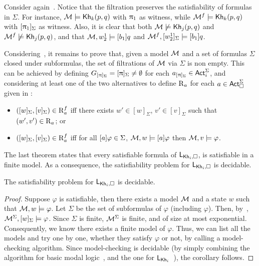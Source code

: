 \medskip 

\begin{example}\label{ex:filtration-preserves}
 Consider again~. Notice that the filtration preserves the satisfiability of formulas in $\Sigma$. For instance, $\mathcal{M}\models{\sf Kh}_k(p,q)$ with $\uppi_1$ as witness, while $\mathcal{M}^f\models{\sf Kh}_k(p,q)$ with $[\uppi_1]_\Sigma$ as witness. Also, it is clear that both $\mathcal{M}\not\models{\sf Kh}_j(p,q)$ and $\mathcal{M}^f\not\models{\sf Kh}_j(p,q)$, and that $\mathcal{M},w^1_2\models[b_1]q$ and $\mathcal{M}^f,[w^1_2]_\Sigma\models[b_1]q$.
\end{example}

\medskip

Considering~, it remains to prove that, given a model $\mathcal{M}$ and a set of formulas $\Sigma$ closed under subformulas, the set of filtrations of $\mathcal{M}$ via $\Sigma$ is non empty.
This can be achieved by defining $G_{[\uppi]_\Sigma} = [\uppi]_\Sigma \neq \emptyset$ for each $a_{[\uppi]_\Sigma} \in {\rm \sf Act}^\Sigma_i$, and considering at least one of the two alternatives to define $\operatorname{R}_a$ for each $a \in {\rm \sf Act}^\Sigma_\square$ given in \cite{HML,mlbook}:

\begin{itemize}
\item $([w]_\Sigma,[v]_\Sigma) \in \operatorname{R}^f_a$ iff there exists $w' \in [w]_\Sigma$, $v' \in [v]_\Sigma$ such that $(w',v') \in \operatorname{R}_a$; or
\item $([w]_\Sigma,[v]_\Sigma) \in \operatorname{R}^f_a$ iff for all $[a]\varphi \in \Sigma$, $\mathcal{M},w \models [a]\varphi$ then $\mathcal{M},v \models \varphi$.
\end{itemize}
 
\medskip

The last theorem states that every satisfiable formula of $\mathsf{L}_{{\sf Kh}_i,\square}$, is satisfiable in a finite model.
As a consequence, the satisfiability problem for $\mathsf{L}_{{\sf Kh}_i,\square}$ is decidable.

\medskip

\begin{corollary}\label{cor:extended-decidable}
The satisfiability problem for $\mathsf{L}_{{\sf Kh}_i,\square}$ is decidable.
\end{corollary}

\begin{proof}
Suppose $\varphi$ is satisfiable, then there exists a model $\mathcal{M}$ and a state $w$ such that $\mathcal{M},w\models\varphi$. Let $\Sigma$ be the set of subformulas of $\varphi$ (including $\varphi$). Then, by~, $\mathcal{M}^\Sigma,[w]_\Sigma\models\varphi$. Since $\Sigma$ is finite, $\mathcal{M}^\Sigma$ is finite, and of size at most exponential. Consequently, we know there exists a finite model of $\varphi$. Thus, we can list all the models and try one by one, whether they satisfy $\varphi$ or not, by calling a model-checking algorithm. Since model-checking is decidable (by simply combining the algorithm for basic modal logic~\cite{mlbook}, and the one for $\mathsf{L}_{{\sf Kh}_i}$~\cite{AFSVQ21,AFSVQ23report}), the corollary follows. 
\end{proof}


